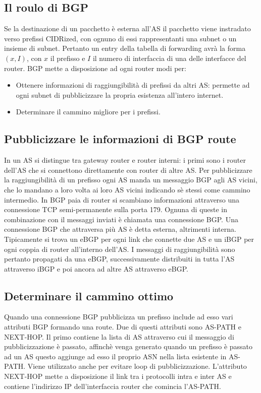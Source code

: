 \subsection{Il roulo di BGP}
Se la destinazione di un pacchetto \`e esterna all'AS il pacchetto viene instradato verso prefissi CIDRized, con ognuno di essi rappresentanti una subnet o
un insieme di subnet. Pertanto un entry della tabella di forwarding avr\`a la forma $(x, I)$, con $x$ il prefisso e $I$ il numero di interfaccia di una 
delle interfacce del router. BGP mette a disposizione ad ogni router modi per:
\begin{itemize}
\item Ottenere informazioni di raggiungibilit\`a di prefissi da altri AS: permette ad ogni subnet di pubblicizzare la propria esistenza all'intero internet.
\item Determinare il cammino migliore per i prefissi.
\end{itemize}
\subsection{Pubblicizzare le informazioni di BGP route}
In un AS si distingue tra gateway router e router interni: i primi sono i router dell'AS che si connettono direttamente con router di altre AS. Per 
pubblicizzare la raggiungibilit\`a di un prefisso ogni AS manda un messaggio BGP agli AS vicini, che lo mandano a loro volta ai loro AS vicini indicando 
s\`e stessi come cammino intermedio. In BGP paia di router si scambiano informazioni attraverso una connessione TCP semi-permanente sulla porta 179. Ognuna
di queste in combinazione con il messaggi inviati \`e chiamata una connessione BGP. Una connessione BGP che attraversa pi\`u AS \`e detta esterna, 
altrimenti interna. Tipicamente si trova un eBGP per ogni link che connette due AS e un iBGP per ogni coppia di router all'interno dell'AS. I messaggi di 
raggiungibilit\`a sono pertanto propagati da una eBGP, successivamente distribuiti in tutta l'AS attraverso iBGP e poi ancora ad altre AS attraverso eBGP.
\subsection{Determinare il cammino ottimo}
Quando una connessione BGP pubblicizza un prefisso include ad esso vari attributi BGP formando una route. Due di questi attributi sono AS-PATH e NEXT-HOP.
Il primo contiene la lista di AS attraverso cui il messaggio di pubblicizzazione \`e passato, affinch\`e venga generato quando un prefisso \`e passato
ad un AS questo aggiunge ad esso il proprio ASN nella lista esistente in AS-PATH. Viene utilizzato anche per evitare loop di pubblicizzazione. L'attributo 
NEXT-HOP mette a disposizione il link tra i protocolli intra e inter AS e contiene l'indirizzo IP dell'interfaccia router che comincia l'AS-PATH.
